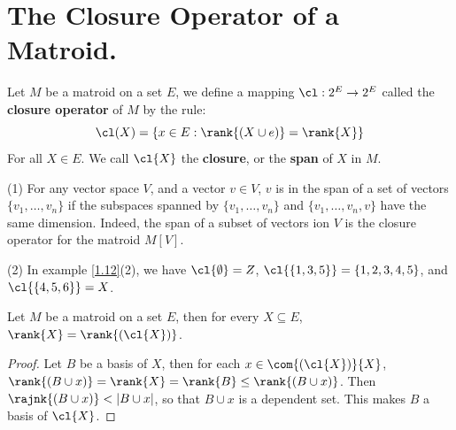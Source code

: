 
\section{The Closure Operator of a Matroid.}

\begin{definition}
    Let $M$ be a matroid on a set $E$, we define a mapping $\cl:2^E \rightarrow
    2^E$ called the \textbf{closure operator} of $M$ by the rule:
    \begin{equation*}
        \cl(X)=\{x \in E : \rank{(X \cup e)}=\rank{X}\}
    \end{equation*}
    For all $X \in E$. We call  $\cl{X}$ the \textbf{closure}, or the
    \textbf{span} of $X$ in  $M$.
\end{definition}

\begin{example}\label{1.14}
    \item[(1)] For any vector space $V$, and a vector  $v \in V$,  $v$ is in the
        span of a set of vectors  $\{v_1, \dots, v_n\}$ if the subspaces spanned
        by $\{v_1, \dots, v_n\}$ and $\{v_1, \dots, v_n,v\}$ have the same
        dimension. Indeed, the span of a subset of vectors ion $V$ is the closure
        operator for the matroid  $M[V]$.

    \item[(2)] In example \ref{1.12}(2), we have $\cl{\emptyset}=Z$,
        $\cl{\{1,3,5\}}=\{1,2,3,4,5\}$, and $\cl{\{4,5,6\}}=X$.
\end{example}

\begin{lemma}\label{1.4.1}
    Let $M$ be a matroid on a set  $E$, then for every $X \subseteq E$,
    $\rank{X}=\rank{(\cl{X})}$.
\end{lemma}
\begin{proof}
    Let $B$ be a basis of  $X$, then for each  $x \in \com{(\cl{X})}{X}$,
    $\rank{(B \cup x)}=\rank{X}=\rank{B} \leq \rank{(B \cup x)}$. Then
    $\rajnk{(B \cup x)}<|B \cup x|$, so that $B \cup x$ is a dependent set. This
    makes  $B$ a basis of  $\cl{X}$.
\end{proof}

